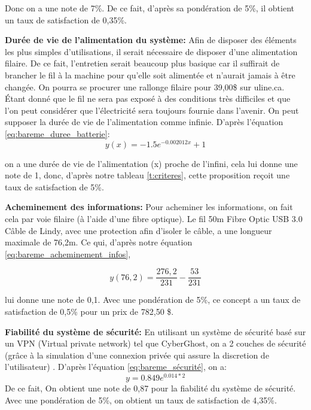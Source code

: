 Donc on a une note de 7\%. De ce fait, d'après sa pondération de 5\%, il obtient un taux de satisfaction de 0,35\%.
\vspace{5mm}


\textbf{Durée de vie de l'alimentation du système:} Afin de disposer des éléments les plus simples d'utilisations, il serait nécessaire de disposer d'une alimentation filaire. De ce fait, l'entretien serait beaucoup plus basique car il suffirait de brancher le fil à la machine pour qu'elle soit alimentée et n'aurait jamais à être changée. On pourra se procurer une rallonge filaire pour 39,00\$ sur uline.ca. Étant donné que le fil ne sera pas exposé à des conditions très difficiles et que l'on peut considérer que l'électricité sera toujours fournie dans l'avenir. On peut supposer la durée de vie de l'alimentation comme infinie.
D'après l'équation \ref{eq:bareme_duree_batterie}:
\begin{equation}
    y(x) = -1.5e^{-0.002012x} + 1 
        \end{equation}

on a une durée de vie de l'alimentation (x) proche de l'infini, cela lui donne une note de 1, donc, d'après notre tableau \ref{t:criteres}, cette proposition reçoit une taux de satisfaction de 5\%.
\vspace{5mm}


\textbf{Acheminement des informations:}
Pour acheminer les informations, on fait cela par voie filaire (à l'aide d'une fibre optique). Le fil 50m Fibre Optic USB 3.0 Câble de Lindy, avec une protection afin d'isoler le câble, a une longueur maximale de 76,2m. Ce qui, d'après notre équation \ref{eq:bareme_acheminement_infos},

\begin{equation}
    y(76,2) = 
        \frac{276,2}{231} - \frac{53}{231}
\end{equation}

lui donne une note de 0,1. Avec une pondération de 5\%, ce concept a un taux de satisfaction de 0,5\% pour un prix de 782,50 \$.
\vspace{5mm}


\textbf{Fiabilité du système de sécurité:}
En utilisant un système de sécurité basé sur un VPN (Virtual private network) tel que CyberGhost, on a 2 couches de sécurité (grâce à la simulation d’une connexion privée qui assure la discretion de l'utilisateur) . D'après l'équation \ref{eq:bareme_sécurité}, on a:
\begin{equation}
    y = 0.849 e^{0.014*2}
\end{equation}
De ce fait, On obtient une note de 0,87 pour la fiabilité du système de sécurité. Avec une pondération de 5\%, on obtient un taux de satisfaction de 4,35\%.
\vspace{5mm}


